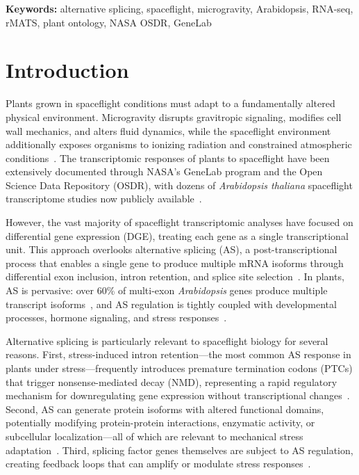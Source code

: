 \documentclass[12pt,a4paper]{article}
\begin{document}
\begin{abstract}
plant spaceflight adaptation and provide a reusable, FAIR-compliant analysis pipeline for the broader space biology community.
\end{abstract}

\textbf{Keywords:} alternative splicing, spaceflight, microgravity, Arabidopsis, RNA-seq, rMATS, plant ontology, NASA OSDR, GeneLab

\section{Introduction}

Plants grown in spaceflight conditions must adapt to a fundamentally altered physical environment. Microgravity disrupts gravitropic signaling, modifies cell wall mechanics, and alters fluid dynamics, while the spaceflight environment additionally exposes organisms to ionizing radiation and constrained atmospheric conditions~\cite{paul2017}. The transcriptomic responses of plants to spaceflight have been extensively documented through NASA's GeneLab program and the Open Science Data Repository (OSDR), with dozens of \textit{Arabidopsis thaliana} spaceflight transcriptome studies now publicly available~\cite{beheshti2018, ray2022}.

However, the vast majority of spaceflight transcriptomic analyses have focused on differential gene expression (DGE), treating each gene as a single transcriptional unit. This approach overlooks alternative splicing (AS), a post-transcriptional process that enables a single gene to produce multiple mRNA isoforms through differential exon inclusion, intron retention, and splice site selection~\cite{reddy2013}. In plants, AS is pervasive: over 60\% of multi-exon \textit{Arabidopsis} genes produce multiple transcript isoforms~\cite{marquez2012}, and AS regulation is tightly coupled with developmental processes, hormone signaling, and stress responses~\cite{staiger2013, filichkin2015}.

Alternative splicing is particularly relevant to spaceflight biology for several reasons. First, stress-induced intron retention---the most common AS response in plants under stress---frequently introduces premature termination codons (PTCs) that trigger nonsense-mediated decay (NMD), representing a rapid regulatory mechanism for downregulating gene expression without transcriptional changes~\cite{kalyna2012, drechsel2016}. Second, AS can generate protein isoforms with altered functional domains, potentially modifying protein-protein interactions, enzymatic activity, or subcellular localization---all of which are relevant to mechanical stress adaptation~\cite{syed2012}. Third, splicing factor genes themselves are subject to AS regulation, creating feedback loops that can amplify or modulate stress responses~\cite{reddy2011}.
\end{document}
